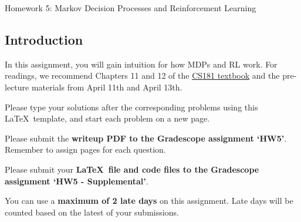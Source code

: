 \documentclass[submit]{harvardml}
\begin{document}
\begin{center}
{\Large Homework 5: Markov Decision Processes and Reinforcement Learning}\\
\end{center}

\subsection*{Introduction}

In this assignment, you will gain intuition for how MDPs and RL work.  For readings, we recommend Chapters 11 and 12 of the \href{https://github.com/harvard-ml-courses/cs181-textbook/blob/master/Textbook.pdf}{CS181 textbook} and the pre-lecture materials from April 11th and April 13th.

Please type your solutions after the corresponding problems using this
\LaTeX\ template, and start each problem on a new page.

Please submit the \textbf{writeup PDF to the Gradescope assignment `HW5'}. Remember to assign pages for each question.

Please submit your \textbf{\LaTeX\ file and code files to the Gradescope assignment `HW5 - Supplemental'}. 

You can use a \textbf{maximum of 2 late days} on this assignment.  Late days will be counted based on the latest of your submissions. 
\\

\end{document}

